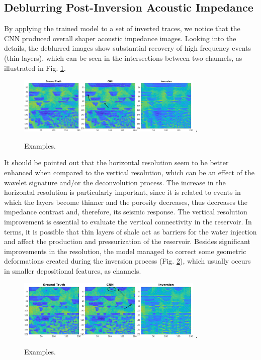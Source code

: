 \documentclass[journal]{IEEEtran}
\begin{document}
\subsection{Deblurring Post-Inversion Acoustic Impedance}
By applying the trained model to a set of inverted traces,
we notice that the CNN produced overall shaper acoustic
impedance images. Looking into the details,
the deblurred images show substantial recovery of high frequency events
(thin layers), which can be seen in the intersections between
two channels, as illustrated in Fig. \ref{ImSec26}.
\begin{figure}[!t]
\centering
\includegraphics[width=3.5in]{Figs/ImSec26}
\DeclareGraphicsExtensions.
\caption{Examples.}
\label{ImSec26}
\end{figure}

It should be pointed out that the horizontal resolution seem to be
better enhanced when compared to the vertical resolution, which can
be an effect of the wavelet signature and/or the deconvolution process.
The increase in the horizontal resolution is particularly important,
since it is related to events in which the layers become thinner and the porosity
decreases, thus decreases the impedance contrast and, therefore, its
seismic response. The vertical resolution improvement is essential to
evaluate the vertical connectivity in the reservoir. In terms, it is possible
that thin layers of shale act as barriers for the water injection and affect the production
and pressurization of the reservoir. Besides significant improvements
in the resolution, the model managed to correct some geometric deformations
created during the inversion process (Fig. \ref{ImSec36}), which usually
occurs in smaller depositional features, as channels.
\begin{figure}[!t]
\centering
\includegraphics[width=3.5in]{Figs/ImSec36}
\DeclareGraphicsExtensions.
\caption{Examples.}
\label{ImSec36}
\end{figure}
\end{document}
